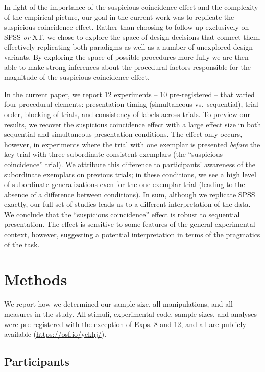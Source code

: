 \documentclass[english,floatsintext,man]{apa6}
\theoremstyle{definition}
\theoremstyle{definition}
\theoremstyle{remark}
\begin{document}
In light of the importance of the suspicious coincidence effect and the
complexity of the empirical picture, our goal in the current work was to
replicate the suspicious coincidence effect. Rather than choosing to
follow up exclusively on SPSS \emph{or} XT, we chose to explore the
space of design decisions that connect them, effectively replicating
both paradigms as well as a number of unexplored design variants. By
exploring the space of possible procedures more fully we are then able
to make strong inferences about the procedural factors responsible for
the magnitude of the suspicious coincidence effect.

In the current paper, we report 12 experiments -- 10 pre-registered --
that varied four procedural elements: presentation timing (simultaneous
vs.~sequential), trial order, blocking of trials, and consistency of
labels across trials. To preview our results, we recover the suspicious
coincidence effect with a large effect size in both sequential and
simultaneous presentation conditions. The effect only occurs, however,
in experiments where the trial with one exemplar is presented
\emph{before} the key trial with three subordinate-consistent exemplars
(the \enquote{suspicious coincidence} trial). We attribute this
difference to participants' awareness of the subordinate exemplars on
previous trials; in these conditions, we see a high level of subordinate
generalizations even for the one-exemplar trial (leading to the absence
of a difference between conditions). In sum, although we replicate SPSS
exactly, our full set of studies leads us to a different interpretation
of the data. We conclude that the \enquote{suspicious coincidence}
effect is robust to sequential presentation. The effect is sensitive to
some features of the general experimental context, however, suggesting a
potential interpretation in terms of the pragmatics of the task.

\section{Methods}\label{methods}

We report how we determined our sample size, all manipulations, and all
measures in the study. All stimuli, experimental code, sample sizes, and
analyses were pre-registered with the exception of Exps. 8 and 12, and
all are publicly available (\url{https://osf.io/yekhj/}).

\subsection{Participants}\label{participants}
\end{document}
